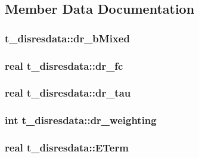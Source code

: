 \subsection{\-Member \-Data \-Documentation}
\hypertarget{structt__disresdata_a31b4b7aa4ff77c5e853d08d7d5b3a17e}{
\subsubsection[{dr\-\_\-b\-Mixed}]{ {\bf t\-\_\-disresdata\-::dr\-\_\-b\-Mixed}}}\label{structt__disresdata_a31b4b7aa4ff77c5e853d08d7d5b3a17e}
\hypertarget{structt__disresdata_ae03b13310b824a7f5045230c6f44335f}{
\subsubsection[{dr\-\_\-fc}]{\setlength{\rightskip}{0pt plus 5cm}real {\bf t\-\_\-disresdata\-::dr\-\_\-fc}}}\label{structt__disresdata_ae03b13310b824a7f5045230c6f44335f}
\hypertarget{structt__disresdata_a3be69e951894d82d404a2d924d5a914a}{
\subsubsection[{dr\-\_\-tau}]{\setlength{\rightskip}{0pt plus 5cm}real {\bf t\-\_\-disresdata\-::dr\-\_\-tau}}}\label{structt__disresdata_a3be69e951894d82d404a2d924d5a914a}
\hypertarget{structt__disresdata_a3f528cf388665a79fcffb6d2eade4792}{
\subsubsection[{dr\-\_\-weighting}]{\setlength{\rightskip}{0pt plus 5cm}int {\bf t\-\_\-disresdata\-::dr\-\_\-weighting}}}\label{structt__disresdata_a3f528cf388665a79fcffb6d2eade4792}
\hypertarget{structt__disresdata_aa3eb2a05de3e28d95906ddc95531f4d4}{
\subsubsection[{\-E\-Term}]{\setlength{\rightskip}{0pt plus 5cm}real {\bf t\-\_\-disresdata\-::\-E\-Term}}}\label{structt__disresdata_aa3eb2a05de3e28d95906ddc95531f4d4}
